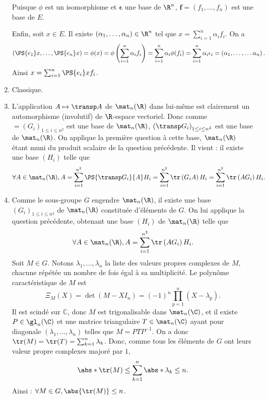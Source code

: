 \begin{enonce}
\begin{solution}
\begin{enumerate}
  Puisque $\phi$ est un isomorphisme et $\bm \epsilon$ une base de $\R^n$, $\bm f=\left( f_1,\dotsc,f_n \right)$ est une base de $E$.

Enfin, soit $x\in E$.
Il existe $\left( \alpha_1,\dotsc,\alpha_n \right)\in\R^n$ tel que $x=\sum_{i=1}^n \alpha_i f_i$. On a
\begin{equation*}
  \left( \PS{e_1}x,\dotsc,\PS{e_n}x \right)
  = \phi(x)
  = \phi\left( \sum_{i=1}^n \alpha_if_i \right)
  =\sum_{i=1}^n \alpha_i\phi(f_i)
  =\sum_{i=1}^n \alpha_i \epsilon_i
  =\left( \alpha_1,\dotsc,\dotsc \alpha_n \right).
\end{equation*}
Ainsi $x=\sum_{i=1}^{n}\PS{e_i}x f_i$.
\item Classique.
\item L'application $A\mapsto\transp A$ de $\mat_n(\R)$ dans lui-même est clairement un automorphisme (involutif) de $\R$-espace vectoriel.
  Donc comme $=\left( G_i \right)_{1\leq i\leq n^2}$ est une base de $\mat_n(\R)$, $\left( \transp G_i \right)_{1\leq i\leq n^2}$ est une base de $\mat_n(\R)$.
  On applique la première question à cette base, $\mat_n(\R)$ étant muni du produit scalaire de la question précédente. Il vient : il existe une base $\left( H_i \right)$ telle que
  \begin{equation*}
    \forall A\in\mat_n(\R),
    A
    =\sum_{i=1}^{n^2} \PS{\transp G_i}{A} H_i
    =\sum_{i=1}^{n^2} \tr\left( G_i A\right)  H_i
    =\sum_{i=1}^{n^2} \tr\left( A G_i\right)  H_i.
  \end{equation*}

\item Comme le sous-groupe $G$ engendre $\mat_n(\R)$, il existe une base $\left( G_i \right)_{1\leq i\leq n^2}$ de $\mat_n(\R)$ constituée d'éléments de $G$.
  On lui applique la question précédente, obtenant une base $\left( H_i \right)$ de $\mat_n(\R)$ telle que
\begin{equation*}
    \forall A\in\mat_n(\R),
    A
    =\sum_{i=1}^{n^2} \tr\left( A G_i\right)  H_i.
  \end{equation*}
Soit $M\in G$. Notons $\lambda_1,\dotsc,\lambda_n$ la liste des valeurs propres complexes de $M$, chacune répétée un nombre de fois égal à sa multiplicité.
Le polynôme caractéristique de $M$ est
\begin{equation*}
  \Xi_M(X)=\det(M-XI_n) = (-1)^n\prod_{p=1}^n (X-\lambda_p).
\end{equation*}
Il est scindé sur $\mathbb{C}$, donc $M$ est trigonalisable dans $\mat_n(\C)$, et il existe $P\in\gl_n(\C)$ et une matrice triangulaire $T\in\mat_n(\C)$ ayant pour diagonale $(\lambda_1,\dotsc,\lambda_n)$ telles que $M=P T P^{-1}$.
On a donc $\tr(M)=\tr(T)=\sum_{k=1}^n \lambda_k$.
Donc, comme tous les éléments de $G$ ont leurs valeur propre complexes majoré par $1$,
\begin{equation*}
  \abs*{\tr(M)}\leq\sum_{k=1}^n \abs*{\lambda_k}\leq n.
\end{equation*}
Ainsi : $\forall M\in G, \abs{\tr(M)}\leq n$.


\end{enumerate}
\end{solution}
\end{enonce}
